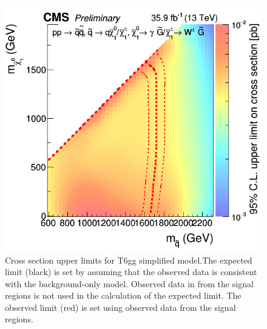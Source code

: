 \begin{figure}[h]
	\centering
	\includegraphics[width=0.9\linewidth]{Figures/T6WgJul20XSEC}
	\caption[Cross section upper limits for T6gg simplified model.]{Cross section upper limits for T6gg simplified model.The expected limit (black) is set by assuming that the observed data is consistent with the background-only model.  Observed data in from the signal regions is not used in the calculation of the expected limit.  The observed limit (red) is set using observed data from the signal regions.}
	\label{fig:t6wgjul20xsec}
\end{figure}




